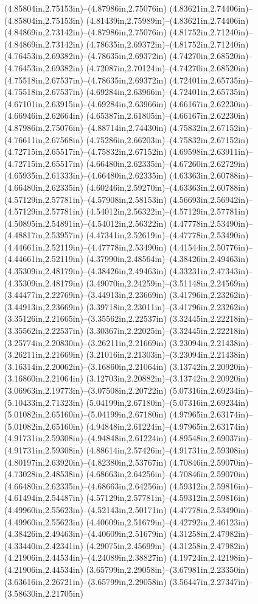 (4.85804in,2.75153in)--(4.87986in,2.75076in) (4.83621in,2.74406in)--(4.85804in,2.75153in) (4.81439in,2.75989in)--(4.83621in,2.74406in) (4.84869in,2.73142in)--(4.87986in,2.75076in) (4.81752in,2.71240in)--(4.84869in,2.73142in) (4.78635in,2.69372in)--(4.81752in,2.71240in) (4.76453in,2.69382in)--(4.78635in,2.69372in) (4.74270in,2.68520in)--(4.76453in,2.69382in) (4.72087in,2.70124in)--(4.74270in,2.68520in) (4.75518in,2.67537in)--(4.78635in,2.69372in) (4.72401in,2.65735in)--(4.75518in,2.67537in) (4.69284in,2.63966in)--(4.72401in,2.65735in) (4.67101in,2.63915in)--(4.69284in,2.63966in) (4.66167in,2.62230in)--(4.66946in,2.62664in) (4.65387in,2.61805in)--(4.66167in,2.62230in) (4.87986in,2.75076in)--(4.88714in,2.74430in) (4.75832in,2.67152in)--(4.76611in,2.67568in) (4.75286in,2.66203in)--(4.75832in,2.67152in) (4.72715in,2.65517in)--(4.75832in,2.67152in) (4.69598in,2.63911in)--(4.72715in,2.65517in) (4.66480in,2.62335in)--(4.67260in,2.62729in) (4.65935in,2.61333in)--(4.66480in,2.62335in) (4.63363in,2.60788in)--(4.66480in,2.62335in) (4.60246in,2.59270in)--(4.63363in,2.60788in) (4.57129in,2.57781in)--(4.57908in,2.58153in) (4.56693in,2.56942in)--(4.57129in,2.57781in) (4.54012in,2.56322in)--(4.57129in,2.57781in) (4.50895in,2.54891in)--(4.54012in,2.56322in) (4.47778in,2.53490in)--(4.48817in,2.53957in) (4.47341in,2.52619in)--(4.47778in,2.53490in) (4.44661in,2.52119in)--(4.47778in,2.53490in) (4.41544in,2.50776in)--(4.44661in,2.52119in) (4.37990in,2.48564in)--(4.38426in,2.49463in) (4.35309in,2.48179in)--(4.38426in,2.49463in) (4.33231in,2.47343in)--(4.35309in,2.48179in) (3.49070in,2.24259in)--(3.51148in,2.24569in) (3.44477in,2.22769in)--(3.44913in,2.23669in) (3.41796in,2.23262in)--(3.44913in,2.23669in) (3.39718in,2.23011in)--(3.41796in,2.23262in) (3.35126in,2.21665in)--(3.35562in,2.22537in) (3.32445in,2.22218in)--(3.35562in,2.22537in) (3.30367in,2.22025in)--(3.32445in,2.22218in) (3.25774in,2.20830in)--(3.26211in,2.21669in) (3.23094in,2.21438in)--(3.26211in,2.21669in) (3.21016in,2.21303in)--(3.23094in,2.21438in) (3.16314in,2.20062in)--(3.16860in,2.21064in) (3.13742in,2.20920in)--(3.16860in,2.21064in) (3.12703in,2.20882in)--(3.13742in,2.20920in) (3.06963in,2.19773in)--(3.07508in,2.20722in) (5.07316in,2.69234in)--(5.10433in,2.71323in) (5.04199in,2.67180in)--(5.07316in,2.69234in) (5.01082in,2.65160in)--(5.04199in,2.67180in) (4.97965in,2.63174in)--(5.01082in,2.65160in) (4.94848in,2.61224in)--(4.97965in,2.63174in) (4.91731in,2.59308in)--(4.94848in,2.61224in) (4.89548in,2.69037in)--(4.91731in,2.59308in) (4.88614in,2.57426in)--(4.91731in,2.59308in) (4.80197in,2.63920in)--(4.82380in,2.53767in) (4.70846in,2.59070in)--(4.73028in,2.48538in) (4.68663in,2.64256in)--(4.70846in,2.59070in) (4.66480in,2.62335in)--(4.68663in,2.64256in) (4.59312in,2.59816in)--(4.61494in,2.54487in) (4.57129in,2.57781in)--(4.59312in,2.59816in) (4.49960in,2.55623in)--(4.52143in,2.50171in) (4.47778in,2.53490in)--(4.49960in,2.55623in) (4.40609in,2.51679in)--(4.42792in,2.46123in) (4.38426in,2.49463in)--(4.40609in,2.51679in) (4.31258in,2.47982in)--(4.33440in,2.42341in) (4.29075in,2.45699in)--(4.31258in,2.47982in) (4.21906in,2.44534in)--(4.24089in,2.38827in) (4.19724in,2.42198in)--(4.21906in,2.44534in) (3.65799in,2.29058in)--(3.67981in,2.23350in) (3.63616in,2.26721in)--(3.65799in,2.29058in) (3.56447in,2.27347in)--(3.58630in,2.21705in) 